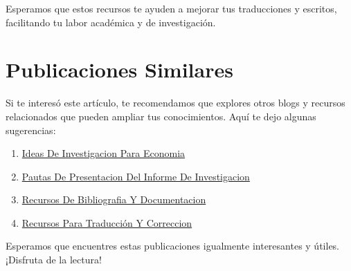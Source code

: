 \documentclass[
  jou,
  floatsintext,
  longtable,
  a4paper,
  nolmodern,
  notxfonts,
  notimes,
  colorlinks=true,linkcolor=blue,citecolor=blue,urlcolor=blue]{apa7}
\providecommand{\tightlist}{%
  \setlength{\itemsep}{0pt}\setlength{\parskip}{0pt}}
\begin{document}
Esperamos que estos recursos te ayuden a mejorar tus traducciones y
escritos, facilitando tu labor académica y de investigación.

\section{Publicaciones Similares}\label{publicaciones-similares}

Si te interesó este artículo, te recomendamos que explores otros blogs y
recursos relacionados que pueden ampliar tus conocimientos. Aquí te dejo
algunas sugerencias:

\begin{enumerate}
\def\labelenumi{\arabic{enumi}.}
\tightlist
\item
  \href{https://achalmaedison.netlify.app/investigacion-metodologia/posts/2023-06-03-ideas-de-investigacion-para-economia/index.pdf}{}
  \href{https://achalmaedison.netlify.app/investigacion-metodologia/posts/2023-06-03-ideas-de-investigacion-para-economia}{Ideas
  De Investigacion Para Economia}
\item
  \href{https://achalmaedison.netlify.app/investigacion-metodologia/posts/2023-06-03-pautas-de-presentacion-del-informe-de-investigacion/index.pdf}{}
  \href{https://achalmaedison.netlify.app/investigacion-metodologia/posts/2023-06-03-pautas-de-presentacion-del-informe-de-investigacion}{Pautas
  De Presentacion Del Informe De Investigacion}
\item
  \href{https://achalmaedison.netlify.app/investigacion-metodologia/posts/2025-01-12-recursos-de-bibliografia-y-documentacion/index.pdf}{}
  \href{https://achalmaedison.netlify.app/investigacion-metodologia/posts/2025-01-12-recursos-de-bibliografia-y-documentacion}{Recursos
  De Bibliografia Y Documentacion}
\item
  \href{https://achalmaedison.netlify.app/investigacion-metodologia/posts/2025-02-09-recursos-para-traducción-y-correccion/index.pdf}{}
  \href{https://achalmaedison.netlify.app/investigacion-metodologia/posts/2025-02-09-recursos-para-traducción-y-correccion}{Recursos
  Para Traducción Y Correccion}
\end{enumerate}

Esperamos que encuentres estas publicaciones igualmente interesantes y
útiles. ¡Disfruta de la lectura!
\end{document}
